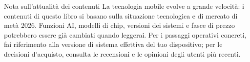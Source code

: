 \begin{tcbwarn}{Nota sull'attualità dei contenuti}
La tecnologia mobile evolve a grande velocità: i contenuti di questo libro si basano sulla situazione tecnologica e di mercato di metà 2026. Funzioni AI, modelli di chip, versioni dei sistemi e fasce di prezzo potrebbero essere già cambiati quando leggerai. Per i passaggi operativi concreti, fai riferimento alla versione di sistema effettiva del tuo dispositivo; per le decisioni d'acquisto, consulta le recensioni e le opinioni degli utenti più recenti.

\end{tcbwarn}
